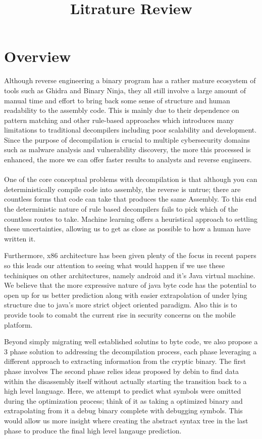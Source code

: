 \documentclass{article}
\author{}
\title{Litrature Review}
\begin{document}
	\maketitle

\section{Overview}
Although reverse engineering a binary program has a rather mature ecosystem of tools such as Ghidra and Binary Ninja, they all still involve a large amount of manual time and effort to bring back some sense of structure and human readability to the assembly code.
This is mainly due to their dependence on pattern matching and other rule-based approaches which introduces many limitations to traditional decompilers including poor scalability and development.
Since the purpose of decompilation is crucial to multiple cybersecurity domains such as malware analysis and vulnerability discovery, the more this processed is enhanced, the more we can offer faster results to analysts and reverse engineers. \\\\

\noindent One of the core conceptual problems with decompilation is that although you can deterministically compile code into assembly, the reverse is untrue; there are countless forms that code can take that produces the same Assembly.
To this end the deterministic nature of rule based decompilers fails to pick which of the countless routes to take.
Machine learning offers a heuristical approach to settling these uncertainties, allowing us to get as close as possible to how a human have written it.

\noindent Furthermore, x86 architecture has been given plenty of the focus in recent papers so this leads our attention to seeing what would happen if we use these techiniques on other architectures, namely android and it's Java virtual machine.
We believe that the more expressive nature of java byte code has the potential to open up for us better prediction along with easier extrapolation of under lying structure due to java's more strict object oriented paradigm.
Also this is to provide tools to comabt the current rise in security concerns on the mobile platform.

\noindent Beyond simply migrating well established solutins to byte code, we also propose a 3 phase solution to addressing the decompilation process, each phase leveraging a different approach to extracting information from the cryptic binary.
The first phase involves
The second phase relies ideas proposed by debin to find data within the disassembly itself without actually starting the transition back to a high level language.
Here, we attempt to predict what symbols were omitted during the optimization process; think of it as taking a optimized binary and extrapolating from it a debug binary complete with debugging symbols.
This would allow us more insight where creating the abstract syntax tree in the last phase to produce the final high level langauge prediction.
\end{document}
